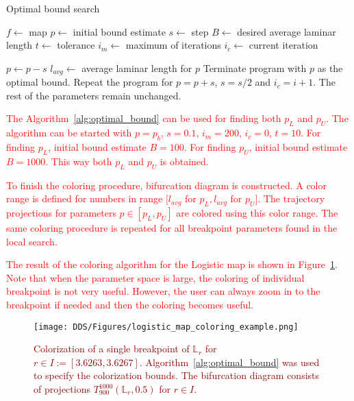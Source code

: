 \begin{algorithm}[!h]
    \caption{Optimal bound search}
    \label{alg:optimal_bound}
    \begin{algorithmic}[1]
        \Statex $f \gets$ map
        \Statex $p \gets$ initial bound estimate
        \Statex $s \gets$ step
        \Statex $B \gets$ desired average laminar length
        \Statex $t \gets$ tolerance
        \Statex $i_{m} \gets$ maximum of iterations
        \Statex $i_{c} \gets$ current iteration

            \State $p \gets p - s$
            \State $l_{avg} \gets$ average laminar length for $p$
                \State Terminate program with $p$ as the optimal bound.
            \EndIf
                \State Repeat the program for $p = p+s$, $s = s/2$ and $i_{c} = i+1$. The rest of the parameters remain unchanged.
            \EndIf
        \EndFor
    \end{algorithmic}
\end{algorithm}

\textcolor{red}{
The Algorithm~\ref{alg:optimal_bound} can be used for finding both $p_L$ and $p_U$.
The algorithm can be started with $p = p_b$, $s = 0.1$, $i_{m} = 200$, $i_{c} = 0$, $t = 10$.
For finding $p_L$, initial bound estimate $B = 100$.
For finding $p_U$, initial bound estimate $B = 1000$.
This way both $p_L$ and $p_U$ is obtained.
}
\par
\textcolor{red}{
To finish the coloring procedure, bifurcation diagram is constructed.
A color range is defined for numbers in range $[ l_{avg}$ for $p_L, l_{avg}$ for $p_U ]$.
The trajectory projections for parameters $p \in [ p_L, p_U ]$ are colored using this color range.
The same coloring procedure is repeated for all breakpoint parameters found in the local search.
}
\par
\textcolor{red}{
The result of the coloring algorithm for the Logistic map is shown in Figure~\ref{fig:coloring_example}.
Note that when the parameter space is large, the coloring of individual breakpoint is not very useful.
However, the user can always zoom in to the breakpoint if needed and then the coloring becomes useful.
}

\begin{figure}[!h]
    \centering
    \texttt{[image: DDS/Figures/logistic\_map\_coloring\_example.png]}
    \caption{
        \textcolor{darkred}{
        Colorization of a single breakpoint of $\mathbb{L}_{r}$ for $r \in I := [ 3.6263, 3.6267 ]$.
        Algorithm~\ref{alg:optimal_bound} was used to specify the colorization bounds.
        The bifurcation diagram consists of projections $T_{900}^{1000}(\mathbb{L}_{r}, 0.5)$ for $r \in I$.
        }
    }
    \label{fig:coloring_example}
\end{figure}

